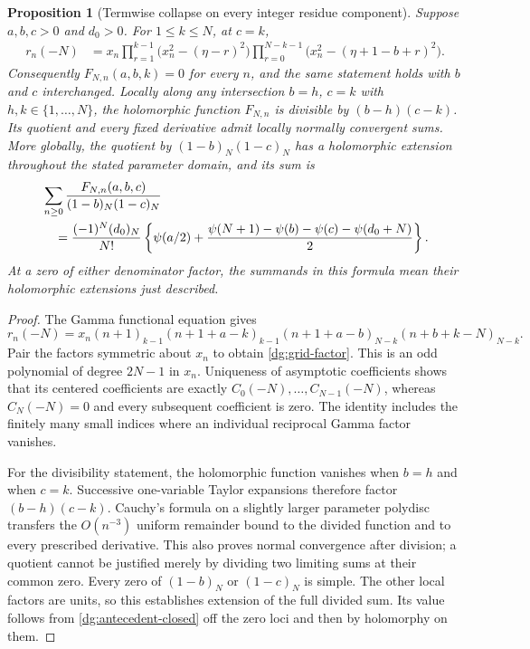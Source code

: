 \documentclass[11pt,a4paper]{article}
\numberwithin{equation}{section}
\newtheorem{proposition}[theorem]{Proposition}
\theoremstyle{definition}
\theoremstyle{remark}
\begin{document}
\begin{proposition}[Termwise collapse on every integer residue component]
\label{dg:polynomial}
Suppose $a,b,c>0$ and $d_0>0$. For $1\leq k\leq N$, at $c=k$,
\begin{align}
 r_n(-N)&=x_n
  \prod_{r=1}^{k-1}\bigl(x_n^2-(\eta-r)^2\bigr)
  \prod_{r=0}^{N-k-1}
        \bigl(x_n^2-(\eta+1-b+r)^2\bigr).
 \label{dg:grid-factor}
\end{align}
Consequently $F_{N,n}(a,b,k)=0$ for every $n$, and the same statement
holds with $b$ and $c$ interchanged. Locally along any intersection
$b=h$, $c=k$ with $h,k\in\{1,\ldots,N\}$, the holomorphic function
$F_{N,n}$ is divisible by $(b-h)(c-k)$. Its quotient and every fixed
derivative admit locally normally convergent sums. More globally, the
quotient by $(1-b)_N(1-c)_N$ has a holomorphic extension throughout
the stated parameter domain, and its sum is
\begin{align}
 &\sum_{n\geq0}\frac{F_{N,n}(a,b,c)}{(1-b)_N(1-c)_N}\notag\\
 &\quad=\frac{(-1)^N(d_0)_N}{N!}
 \left\{\psi(a/2)+
 \frac{\psi(N+1)-\psi(b)-\psi(c)-\psi(d_0+N)}2\right\}.
 \label{dg:divided-grid}
\end{align}
At a zero of either denominator factor, the summands in this formula
mean their holomorphic extensions just described.
\end{proposition}
\begin{proof}
The Gamma functional equation gives
\[
 r_n(-N)=x_n(n+1)_{k-1}(n+1+a-k)_{k-1}
                 (n+1+a-b)_{N-k}(n+b+k-N)_{N-k}.
\]
Pair the factors symmetric about $x_n$ to obtain
\eqref{dg:grid-factor}. This is an odd polynomial of degree
$2N-1$ in $x_n$. Uniqueness of asymptotic coefficients shows that its
centered coefficients are exactly $C_0(-N),\ldots,C_{N-1}(-N)$,
whereas $C_N(-N)=0$ and every subsequent coefficient is zero.
The identity includes the finitely many small indices where an
individual reciprocal Gamma factor vanishes.

For the divisibility statement, the holomorphic function vanishes
when $b=h$ and when $c=k$. Successive one-variable Taylor expansions
therefore factor $(b-h)(c-k)$. Cauchy's formula on a slightly larger
parameter polydisc transfers the $O(n^{-3})$ uniform remainder bound
to the divided function and to every prescribed derivative. This also
proves normal convergence after division; a quotient cannot be justified
merely by dividing two limiting sums at their common zero.
Every zero of $(1-b)_N$ or $(1-c)_N$ is simple. The other local
factors are units, so this establishes extension of the full divided
sum. Its value follows from \eqref{dg:antecedent-closed} off the
zero loci and then by holomorphy on them.
\end{proof}
\end{document}
